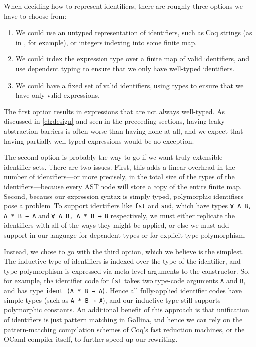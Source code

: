 When deciding how to represent identifiers, there are roughly three options we have to choose from:
\begin{enumerate}
\item
  We could use an untyped representation of identifiers, such as Coq strings (as in \textcite{TemplateCoq}, for example), or integers indexing into some finite map.
\item
  We could index the expression type over a finite map of valid identifiers, and use dependent typing to ensure that we only have well-typed identifiers.
\item
  We could have a fixed set of valid identifiers, using types to ensure that we have only valid expressions.
\end{enumerate}

The first option results in expressions that are not always well-typed.
As discussed in \autoref{ch:design} and seen in the preceeding sections, having leaky abstraction barriers is often worse than having none at all, and we expect that having partially-well-typed expressions would be no exception.

The second option is probably the way to go if we want truly extensible identifier-sets.
There are two issues.
First, this adds a linear overhead in the number of identifiers---or more precisely, in the total size of the types of the identifiers---because every AST node will store a copy of the entire finite map.
Second, because our expression syntax is simply typed, polymorphic identifiers pose a problem.
To support identifiers like \texttt{fst} and \texttt{snd}, which have types \texttt{∀ A B, A * B → A} and \texttt{∀ A B, A * B → B} respectively, we must either replicate the identifiers with all of the ways they might be applied, or else we must add support in our language for dependent types or for explicit type polymorphism.

Instead, we chose to go with the third option, which we believe is the simplest.
The inductive type of identifiers is indexed over the type of the identifier, and type polymorphism is expressed via meta-level arguments to the constructor.
So, for example, the identifier code for \texttt{fst} takes two type-code arguments \texttt{A} and \texttt{B}, and has type \texttt{ident (A * B → A)}.
Hence all fully-applied identifier codes have simple types (such as \texttt{A * B → A}), and our inductive type still supports polymorphic constants.
An additional benefit of this approach is that unification of identifiers is just pattern matching in Gallina, and hence we can rely on the pattern-matching compilation schemes of Coq's fast reduction machines, or the OCaml compiler itself, to further speed up our rewriting.

